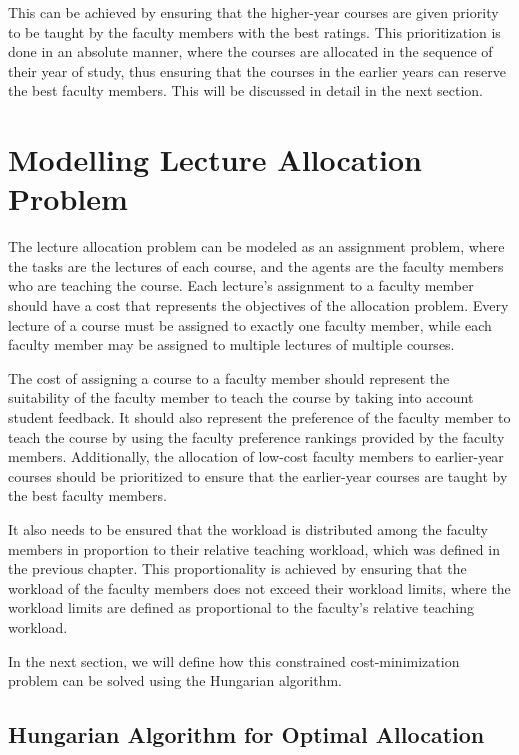 This can be achieved by ensuring that the higher-year courses are given priority to be taught by the faculty members with the best ratings. This prioritization is done in an absolute manner, where the courses are allocated in the sequence of their year of study, thus ensuring that the courses in the earlier years can reserve the best faculty members. This will be discussed in detail in the next section.

\section{Modelling Lecture Allocation Problem}

The lecture allocation problem can be modeled as an assignment problem, where the tasks are the lectures of each course, and the agents are the faculty members who are teaching the course. Each lecture's assignment to a faculty member should have a cost that represents the objectives of the allocation problem. Every lecture of a course must be assigned to exactly one faculty member, while each faculty member may be assigned to multiple lectures of multiple courses.

The cost of assigning a course to a faculty member should represent the suitability of the faculty member to teach the course by taking into account student feedback. It should also represent the preference of the faculty member to teach the course by using the faculty preference rankings provided by the faculty members. Additionally, the allocation of low-cost faculty members to earlier-year courses should be prioritized to ensure that the earlier-year courses are taught by the best faculty members.

It also needs to be ensured that the workload is distributed among the faculty members in proportion to their relative teaching workload, which was defined in the previous chapter. This proportionality is achieved by ensuring that the workload of the faculty members does not exceed their workload limits, where the workload limits are defined as proportional to the faculty's relative teaching workload.

In the next section, we will define how this constrained cost-minimization problem can be solved using the Hungarian algorithm.

\subsection{Hungarian Algorithm for Optimal Allocation}

